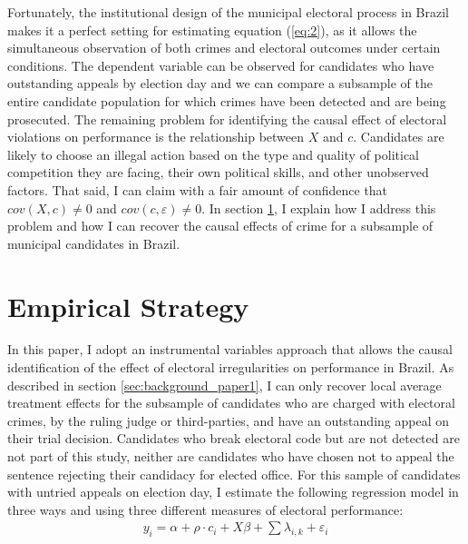 \documentclass[11pt]{article}
\newcommand{\refp}[1]{(\ref{#1})}
\begin{document}
Fortunately, the institutional design of the municipal electoral process in Brazil makes it a perfect setting for estimating equation \refp{eq:2}, as it allows the simultaneous observation of both crimes and electoral outcomes under certain conditions. The dependent variable can be observed for candidates who have outstanding appeals by election day and we can compare a subsample of the entire candidate population for which crimes have been detected and are being prosecuted. The remaining problem for identifying the causal effect of electoral violations on performance is the relationship between $X$ and $c$. Candidates are likely to choose an illegal action based on the type and quality of political competition they are facing, their own political skills, and other unobserved factors. That said, I can claim with a fair amount of confidence that $cov(X,c) \neq 0$ and $cov(c, \varepsilon) \neq 0$. In section \ref{sec:methods_paper1}, I explain how I address this problem and how I can recover the causal effects of crime for a subsample of municipal candidates in Brazil.

\section{Empirical Strategy} \label{sec:methods_paper1}

In this paper, I adopt an instrumental variables approach that allows the causal identification of the effect of electoral irregularities on performance in Brazil. As described in section \ref{sec:background_paper1}, I can only recover local average treatment effects for the subsample of candidates who are charged with electoral crimes, by the ruling judge or third-parties, and have an outstanding appeal on their trial decision. Candidates who break electoral code but are not detected are not part of this study, neither are candidates who have chosen not to appeal the sentence rejecting their candidacy for elected office. For this sample of candidates with untried appeals on election day, I estimate the following regression model in three ways and using three different measures of electoral performance:
\begin{equation} \label{eq:reg1}
  \begin{split}
    y_{i} = \alpha + \rho \cdot c_{i} + X\beta + \sum \lambda_{i, k} + \varepsilon_{i}
  \end{split}
\end{equation}
\end{document}
